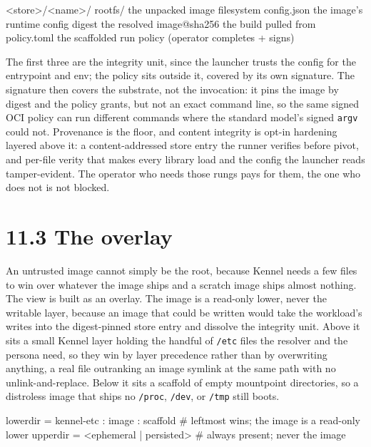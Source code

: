 \begin{kennelcode}
<store>/<name>/
  rootfs/        the unpacked image filesystem
  config.json    the image's runtime config
  digest         the resolved image@sha256 the build pulled from
  policy.toml    the scaffolded run policy (operator completes + signs)
\end{kennelcode}

The first three are the integrity unit, since the launcher trusts the
config for the entrypoint and env; the policy sits outside it, covered
by its own signature. The signature then covers the substrate, not the
invocation: it pins the image by digest and the policy grants, but not
an exact command line, so the same signed OCI policy can run different
commands where the standard model's signed \texttt{argv} could not.
Provenance is the floor, and content integrity is opt-in hardening
layered above it: a content-addressed store entry the runner verifies
before pivot, and per-file verity that makes every library load and the
config the launcher reads tamper-evident. The operator who needs those
rungs pays for them, the one who does not is not blocked.

\hypertarget{the-overlay}{%
\section{11.3 The overlay}\label{the-overlay}}

An untrusted image cannot simply be the root, because Kennel needs a few
files to win over whatever the image ships and a scratch image ships
almost nothing. The view is built as an overlay. The image is a
read-only lower, never the writable layer, because an image that could
be written would take the workload's writes into the digest-pinned store
entry and dissolve the integrity unit. Above it sits a small Kennel
layer holding the handful of \texttt{/etc} files the resolver and the
persona need, so they win by layer precedence rather than by overwriting
anything, a real file outranking an image symlink at the same path with
no unlink-and-replace. Below it sits a scaffold of empty mountpoint
directories, so a distroless image that ships no \texttt{/proc},
\texttt{/dev}, or \texttt{/tmp} still boots.

\begin{kennelcode}
lowerdir = kennel-etc : image : scaffold   # leftmost wins; the image is a read-only lower
upperdir = <ephemeral | persisted>         # always present; never the image
\end{kennelcode}

